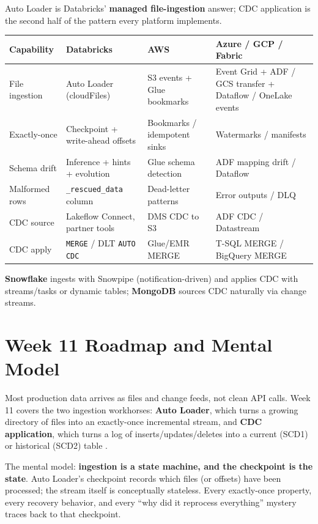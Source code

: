 \begin{crosscloud}
Auto Loader is Databricks' \textbf{managed file-ingestion} answer; CDC application is the second
half of the pattern every platform implements.

\vspace{2mm}
{\footnotesize
\begin{tabular}{@{}p{3.0cm}p{3.4cm}p{3.2cm}p{3.2cm}@{}}
\toprule
\textbf{Capability} & \textbf{Databricks} & \textbf{AWS} & \textbf{Azure / GCP / Fabric} \\
\midrule
File ingestion & Auto Loader (cloudFiles) & S3 events + Glue bookmarks & Event Grid + ADF / GCS transfer + Dataflow / OneLake events \\
Exactly-once & Checkpoint + write-ahead offsets & Bookmarks / idempotent sinks & Watermarks / manifests \\
Schema drift & Inference + hints + evolution & Glue schema detection & ADF mapping drift / Dataflow \\
Malformed rows & \texttt{\_rescued\_data} column & Dead-letter patterns & Error outputs / DLQ \\
CDC source & Lakeflow Connect, partner tools & DMS CDC to S3 & ADF CDC / Datastream \\
CDC apply & \texttt{MERGE} / DLT \texttt{AUTO CDC} & Glue/EMR MERGE & T-SQL MERGE / BigQuery MERGE \\
\bottomrule
\end{tabular}}

\vspace{1mm}
\textbf{Snowflake} ingests with Snowpipe (notification-driven) and applies CDC with streams/tasks
or dynamic tables; \textbf{MongoDB} sources CDC naturally via change streams.
\end{crosscloud}

\section{Week 11 Roadmap and Mental Model}
Most production data arrives as files and change feeds, not clean API calls. Week 11 covers the two ingestion workhorses: \textbf{Auto Loader}, which turns a growing directory of files into an exactly-once incremental stream, and \textbf{CDC application}, which turns a log of inserts/updates/deletes into a current (SCD1) or historical (SCD2) table \cite{databricksAutoLoader,databricksCDC}.

The mental model: \textbf{ingestion is a state machine, and the checkpoint is the state}. Auto Loader's checkpoint records which files (or offsets) have been processed; the stream itself is conceptually stateless. Every exactly-once property, every recovery behavior, and every ``why did it reprocess everything'' mystery traces back to that checkpoint.

